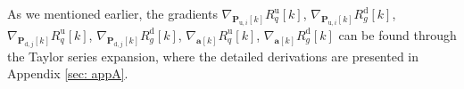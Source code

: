 \documentclass[9pt,journal]{IEEEtran}
\newcommand{\paren}[1]{\left({#1}\right)}
\newcommand{\bracket}[1]{{\left [{#1}\right ]}}
\newcommand{\braces}[1]{{\left\{ {#1}\right\}}}
\newcommand{\rr}{_\mathrm{r}}
\newcommand{\rnr}{_{\mathrm{r},n_\mathrm{r}}}
\newcommand{\target}{\mathrm{t}}
\newcommand{\sigmanr}{\boldsymbol{\Sigma}_{\textrm{t},n\rr}}
\newcommand{\dBjone}{\mathbf{d}_{\textrm{d},j}\bracket{k}}
\newcommand{\dBjoneH}{\mathbf{d}^\dagger_{\textrm{d},j}\bracket{k}}
\newcommand{\dBjn}{\mathbf{d}_{\textrm{d},j}\bracket{k}}
\newcommand{\PiB}{\mathbf{P}_{\textrm{u},i}\bracket{k}}
\newcommand{\PBj}{\mathbf{P}_{\textrm{d},j}\bracket{k}}
\newcommand{\PBg}{\mathbf{P}_{\textrm{d},g}\bracket{k}}
\newcommand{\urk}{\mathbf{u}_{\mathrm{r},n_\mathrm{r}}\bracket{k}}
\begin{document}

As we mentioned earlier, the gradients 
$\nabla_{\PiB}\mathit{R}^\textrm{u}_{q}\bracket{k}$, $\nabla_{\PiB}\mathit{R}^\textrm{d}_{g}\bracket{k}$, $\nabla_{\PBj}\mathit{R}^\textrm{u}_{q}\bracket{k}$, $\nabla_{\PBj}\mathit{R}^\textrm{d}_{g}\bracket{k}$, $\nabla_{\mathbf{a}\bracket{k}}\mathit{R}^\textrm{u}_{q}\bracket{k}$, $\nabla_{\mathbf{a}\bracket{k}}\mathit{R}^\textrm{d}_{g}\bracket{k}$ can be found through the Taylor series expansion, where the detailed derivations are presented in Appendix \ref{sec: appA}. 
\end{document}
